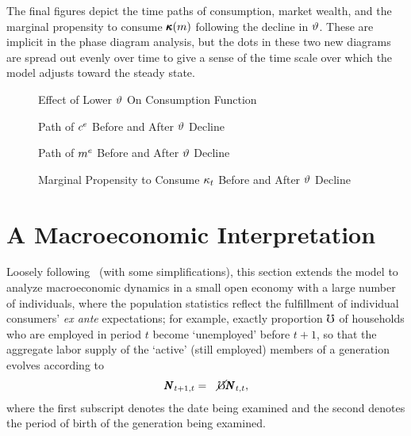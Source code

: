 \documentclass{handout}
\begin{document}
The final figures depict the time paths of consumption, market wealth,
and the marginal propensity to consume $\pmb{\kappa}(m)$ following the
decline in $\vartheta$.  These are implicit in the phase diagram
analysis, but the dots in these two new diagrams are spread out evenly
over time to give a sense of the time scale over which the model
adjusts toward the steady state.

\begin{figure}
\caption{Effect of Lower $\vartheta$ On Consumption Function}
\label{fig:DecreaseTheta}
\end{figure}

\begin{figure}
\caption{Path of $c^{e}$ Before and After $\vartheta$ Decline}
\label{fig:cPathAfterThetaDrop}
\end{figure}

\begin{figure}
\caption{Path of $m^{e}$ Before and After $\vartheta$ Decline}
\label{fig:mPathAfterThetaDrop}
\end{figure}


\begin{figure}
\caption{Marginal Propensity to Consume $\kappa_{t}$ Before and After $\vartheta$ Decline}
\medskip
{}
\label{fig:MPCPathAfterThetaDrop}
\end{figure}

\section{A Macroeconomic Interpretation}

Loosely following~\cite{cjSOE} (with some simplifications), this section extends the model to analyze macroeconomic dynamics in a
small open economy with a large number of individuals, where the
population statistics reflect the fulfillment of individual consumers'
{\it ex ante} expectations; for example, exactly proportion $\mho$
of households who are employed in period $t$ become `unemployed' before
$t+1$, so that the aggregate labor supply of the `active' (still employed) members of a generation
evolves according to
\begin{eqnarray}
  \pmb{N}_{t+1,t} & = & \cancel{\mho} \pmb{N}_{t,t}
,
\end{eqnarray}
where the first subscript denotes the date being examined and the second denotes
the period of birth of the generation being examined.
\end{document}
